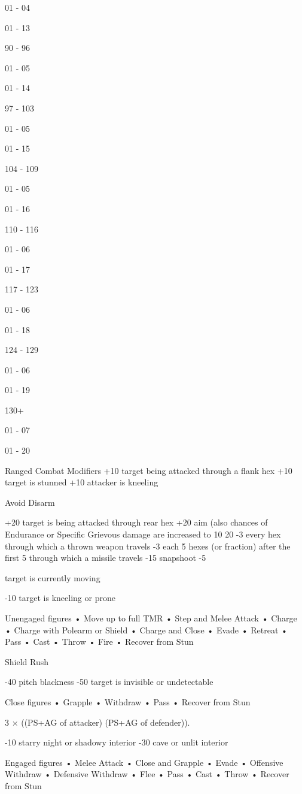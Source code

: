 \documentclass[a4paper]{article}
\begin{document}
\begin{multicols}{3}
01 - 04

01 - 13

90 - 96

01 - 05

01 - 14

97 - 103

01 - 05

01 - 15

104 - 109

01 - 05

01 - 16

110 - 116

01 - 06

01 - 17

117 - 123

01 - 06

01 - 18

124 - 129

01 - 06

01 - 19

130+

01 - 07

01 - 20

Ranged Combat Modifiers
+10 target being attacked through a flank hex
+10 target is stunned
+10 attacker is kneeling

Avoid Disarm

+20 target is being attacked through rear hex
+20 aim (also chances of Endurance or Specific
Grievous damage are increased to 10%
20%
-3 every hex through which a thrown weapon
travels
-3 each 5 hexes (or fraction) after the first 5
through which a missile travels
-15 snapshoot
-5

target is currently moving

-10 target is kneeling or prone

Unengaged figures
• Move up to full TMR
• Step and Melee Attack
• Charge
• Charge with Polearm or Shield
• Charge and Close
• Evade
• Retreat
• Pass
• Cast
• Throw
• Fire
• Recover from Stun

Shield Rush

-40 pitch blackness
-50 target is invisible or undetectable

Close figures
• Grapple
• Withdraw
• Pass
• Recover from Stun

3 × ((PS+AG of attacker) (PS+AG of defender)).

-10 starry night or shadowy interior
-30 cave or unlit interior

Engaged figures
• Melee Attack
• Close and Grapple
• Evade
• Offensive Withdraw
• Defensive Withdraw
• Flee
• Pass
• Cast
• Throw
• Recover from Stun


\end{multicols}
\end{document}
